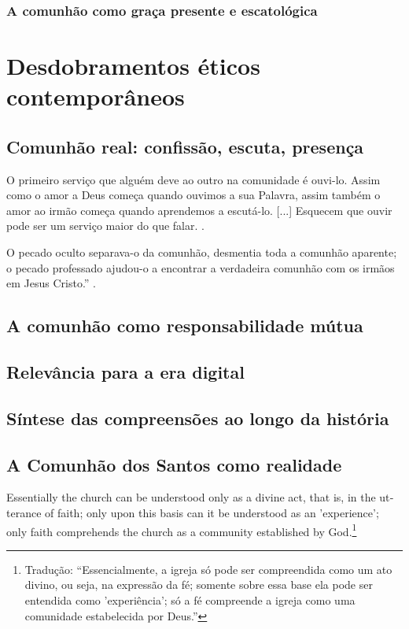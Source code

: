 \subsubsection{A comunhão como graça presente e escatológica}

\section{Desdobramentos éticos contemporâneos}

\subsection{Comunhão real: confissão, escuta, presença}
\begin{citacao}
O primeiro serviço que alguém deve ao outro na comunidade é ouvi-lo. Assim como o amor a Deus começa quando ouvimos a sua Palavra, assim também o amor ao irmão começa quando aprendemos a escutá-lo. [...] Esquecem que ouvir pode ser um serviço maior do que falar. \cite[pp. 75--76]{bonhoeffer1997}.
\end{citacao}

\begin{citacao}O pecado oculto separava-o da comunhão, desmentia toda a comunhão aparente; o pecado professado ajudou-o a encontrar a verdadeira comunhão com os irmãos em Jesus Cristo.'' \cite[p. 80]{bonhoeffer1997}.
\end{citacao}

\subsection{A comunhão como responsabilidade mútua}

\subsection{Relevância para a era digital}

\subsection{Síntese das compreensões ao longo da história}

\subsection{A Comunhão dos Santos como realidade}

\begin{citacao}
\foreignlanguage{english}{Essentially the church can be understood only as a divine act, that is, in the utterance of faith; only upon this basis can it be understood as an 'experience'; only faith comprehends the church as a community established by God.}\footnote{Tradução: ``Essencialmente, a igreja só pode ser compreendida como um ato divino, ou seja, na expressão da fé; somente sobre essa base ela pode ser entendida como 'experiência'; só a fé compreende a igreja como uma comunidade estabelecida por Deus.''} \cite[p. 195]{bonhoeffer1963}
\end{citacao}
